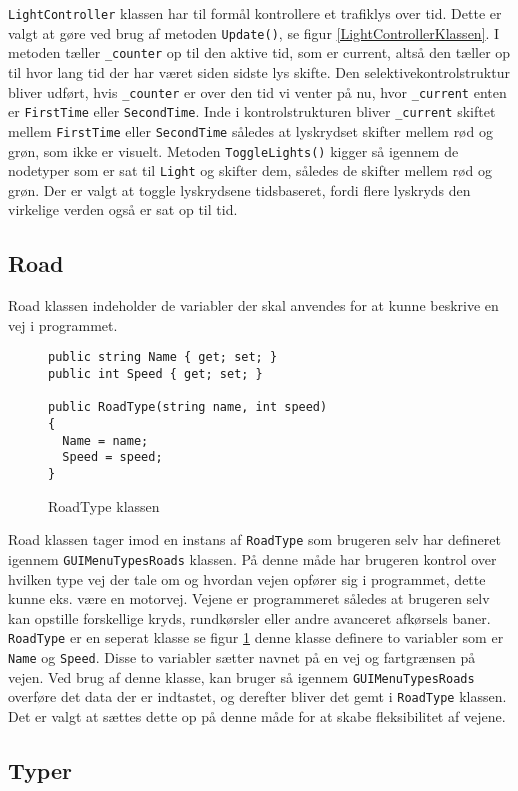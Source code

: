 \texttt{LightController} klassen har til formål kontrollere et trafiklys over tid. Dette er valgt at gøre ved brug af metoden \texttt{Update()}, se figur \ref{LightControllerKlassen}. I metoden tæller \texttt{\_counter} op til den aktive tid, som er current, altså den tæller op til hvor lang tid der har været siden sidste lys skifte. Den selektivekontrolstruktur bliver udført, hvis \texttt{\_counter} er over den tid vi venter på nu, hvor \texttt{\_current} enten er \texttt{FirstTime} eller \texttt{SecondTime}. Inde i kontrolstrukturen bliver \texttt{\_current} skiftet mellem \texttt{FirstTime} eller \texttt{SecondTime} således at lyskrydset skifter mellem rød og grøn, som ikke er visuelt. Metoden \texttt{ToggleLights()} kigger så igennem de nodetyper som er sat til \texttt{Light} og skifter dem, således de skifter mellem rød og grøn. Der er valgt at toggle lyskrydsene tidsbaseret, fordi flere lyskryds den virkelige verden også er sat op til tid.

\subsection{Road}
Road klassen indeholder de variabler der skal anvendes for at kunne beskrive en vej i programmet.

\begin{figure}[H]
\begin{lstlisting}
public string Name { get; set; }
public int Speed { get; set; }
        
public RoadType(string name, int speed)
{
  Name = name;
  Speed = speed;
}
\end{lstlisting}
\caption{RoadType klassen}\label{RoadTypeKlasse}
\end{figure}

Road klassen tager imod en instans af \texttt{RoadType} som brugeren selv har defineret igennem  \texttt{GUIMenuTypesRoads} klassen. På denne måde har brugeren kontrol over hvilken type vej der tale om og hvordan vejen opfører sig i programmet, dette kunne eks. være en motorvej. Vejene er programmeret således at brugeren selv kan opstille forskellige kryds, rundkørsler eller andre avanceret afkørsels baner. \texttt{RoadType} er en seperat klasse se figur \ref{RoadTypeKlasse} denne klasse definere to variabler som er \texttt{Name} og \texttt{Speed}. Disse to variabler sætter navnet på en vej og fartgrænsen på vejen. Ved brug af denne klasse, kan bruger så igennem \texttt{GUIMenuTypesRoads} overføre det data der er indtastet, og derefter bliver det gemt i \texttt{RoadType} klassen. Det er valgt at sættes dette op på denne måde for at skabe fleksibilitet af vejene.

\subsection{Typer}